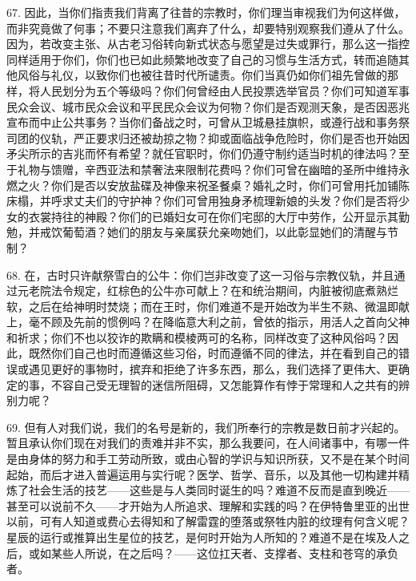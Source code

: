 67. 因此，当你们指责我们背离了往昔的宗教时，你们理当审视我们为何这样做，而非究竟做了何事；不要只注意我们离弃了什么，却要特别观察我们遵从了什么。因为，若改变主张、从古老习俗转向新式状态与愿望是过失或罪行，那么这一指控同样适用于你们，你们也已如此频繁地改变了自己的习惯与生活方式，转而追随其他风俗与礼仪，以致你们也被往昔时代所谴责。你们当真仍如你们祖先曾做的那样，将人民划分为五个等级吗？你们何曾经由人民投票选举官员？你们可知道军事民众会议、城市民众会议和平民民众会议为何物？你们是否观测天象，是否因恶兆宣布而中止公共事务？当你们备战之时，可曾从卫城悬挂旗帜，或遵行战和事务祭司团的仪轨，严正要求归还被劫掠之物？抑或面临战争危险时，你们是否也开始因矛尖所示的吉兆而怀有希望？就任官职时，你们仍遵守制约适当时机的律法吗？至于礼物与馈赠，辛西亚法和禁奢法来限制花费吗？你们可曾在幽暗的圣所中维持永燃之火？你们是否以安放盐碟及神像来祝圣餐桌？婚礼之时，你们可曾用托加铺陈床榻，并呼求丈夫们的守护神？你们可曾用独身矛梳理新娘的头发？你们是否将少女的衣裳持往的神殿？你们的已婚妇女可在你们宅邸的大厅中劳作，公开显示其勤勉，并戒饮葡萄酒？她们的朋友与亲属获允亲吻她们，以此彰显她们的清醒与节制？\par

68. 在，古时只许献祭雪白的公牛：你们岂非改变了这一习俗与宗教仪轨，并且通过元老院法令规定，红棕色的公牛亦可献上？在和统治期间，内脏被彻底煮熟烂软，之后在给神明时焚烧；而在王时，你们难道不是开始改为半生不熟、微温即献上，毫不顾及先前的惯例吗？在降临意大利之前，曾依的指示，用活人之首向父神和祈求；你们不也以狡诈的欺瞒和模棱两可的名称，同样改变了这种风俗吗？因此，既然你们自己也时而遵循这些习俗，时而遵循不同的律法，并在看到自己的错误或遇见更好的事物时，摈弃和拒绝了许多东西，那么，我们选择了更伟大、更确定的事，不容自己受无理智的迷信所阻碍，又怎能算作有悖于常理和人之共有的辨别力呢？\par

69. 但有人对我们说，我们的名号是新的，我们所奉行的宗教是数日前才兴起的。暂且承认你们现在对我们的责难并非不实，那么我要问，在人间诸事中，有哪一件是由身体的努力和手工劳动所致，或由心智的学识与知识所获，又不是在某个时间起始，而后才进入普遍运用与实行呢？医学、哲学、音乐，以及其他一切构建并精炼了社会生活的技艺——这些是与人类同时诞生的吗？难道不反而是直到晚近——甚至可以说前不久——才开始为人所追求、理解和实践的吗？在伊特鲁里亚的出世以前，可有人知道或费心去得知和了解雷霆的堕落或祭牲内脏的纹理有何含义呢？星辰的运行或推算出生星位的技艺，是何时开始为人所知的？难道不是在埃及人之后，或如某些人所说，在之后吗？——这位扛天者、支撑者、支柱和苍穹的承负者。\par


